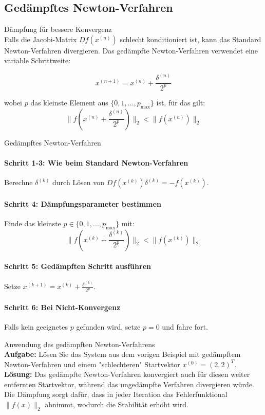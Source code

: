 \subsection{Gedämpftes Newton-Verfahren}

\begin{concept}{Dämpfung für bessere Konvergenz}\\
Falls die Jacobi-Matrix $Df(x^{(n)})$ schlecht konditioniert ist, kann das Standard Newton-Verfahren divergieren. Das gedämpfte Newton-Verfahren verwendet eine variable Schrittweite:

$$x^{(n+1)} = x^{(n)} + \frac{\delta^{(n)}}{2^p}$$

wobei $p$ das kleinste Element aus $\{0, 1, ..., p_{\max}\}$ ist, für das gilt:
$$\|f(x^{(n)} + \frac{\delta^{(n)}}{2^p})\|_2 < \|f(x^{(n)})\|_2$$
\end{concept}

\begin{KR}{Gedämpftes Newton-Verfahren}\\
\paragraph{Schritt 1-3: Wie beim Standard Newton-Verfahren}
Berechne $\delta^{(k)}$ durch Lösen von $Df(x^{(k)}) \delta^{(k)} = -f(x^{(k)})$.

\paragraph{Schritt 4: Dämpfungsparameter bestimmen}
Finde das kleinste $p \in \{0, 1, ..., p_{\max}\}$ mit:
$$\|f(x^{(k)} + \frac{\delta^{(k)}}{2^p})\|_2 < \|f(x^{(k)})\|_2$$

\paragraph{Schritt 5: Gedämpften Schritt ausführen}
Setze $x^{(k+1)} = x^{(k)} + \frac{\delta^{(k)}}{2^p}$.

\paragraph{Schritt 6: Bei Nicht-Konvergenz}
Falls kein geeignetes $p$ gefunden wird, setze $p = 0$ und fahre fort.
\end{KR}

\begin{example2}{Anwendung des gedämpften Newton-Verfahrens}\\
\textbf{Aufgabe:} Lösen Sie das System aus dem vorigen Beispiel mit gedämpftem Newton-Verfahren und einem "schlechteren" Startvektor $x^{(0)} = (2, 2)^T$.
\tcblower
\textbf{Lösung:}
Das gedämpfte Newton-Verfahren konvergiert auch für diesen weiter entfernten Startvektor, während das ungedämpfte Verfahren divergieren würde. Die Dämpfung sorgt dafür, dass in jeder Iteration das Fehlerfunktional $\|f(x)\|_2$ abnimmt, wodurch die Stabilität erhöht wird.
\end{example2}

